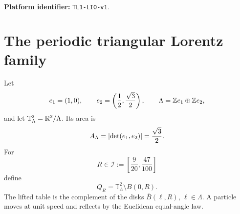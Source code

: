 
\begin{abstract}
We construct a deterministic path-ensemble theory on a compact periodic
finite-horizon Sinai billiard with a genuinely nonconjugate moving scatterer.
The configuration is the triangular lattice Lorentz gas with one circular
scatterer per cell and radius in a compact subinterval of
$(\sqrt3/4,1/2)$.  The quotient table is compact, the horizon is uniformly
finite, and the collision map preserves the natural Liouville cosine measure.
In fixed angular boundary coordinates this measure is independent of the
radius.

The mechanical observable is the first lattice coordinate of the actual cell
displacement between successive collisions.  Its twisted Lorentz transfer
operator has a simple leading eigenvalue near the origin.  We derive a local
large-deviation principle, prove strict convexity from the nondegenerate Lorentz displacement
local-limit packet, and define the endogenous conjugate field by
$\theta_R(j)=(\Lambda_R')^{-1}(j)=I_R'(j)$.  A new two-sided central-window
Gibbs-conditioning theorem identifies current-conditioned Liouville paths with
the canonical driven equilibrium, with the endpoint eigenfunction bias
removed.  The driven kernel is only a conditional representation: every full
trajectory remains a deterministic orbit of the same specular billiard.

The radius family is not a similarity family.  Two normal period-two orbits
have incommensurate radius responses, and the mean free-flight time has an
explicit strictly negative Santal\'o derivative.  These results provide the
single physical platform imported by the remaining four papers.
\end{abstract}
\maketitle
\noindent\textbf{Platform identifier:} \texttt{TL1-LIO-v1}.

\tableofcontents

\section{The periodic triangular Lorentz family}\label{sec:geometry}
Let
\[
 e_1=(1,0),\qquad e_2=\left(\frac12,\frac{\sqrt3}{2}\right),
 \qquad \Lambda=\mathbb Z e_1\oplus\mathbb Z e_2,
\]
and let $\mathbb T_\Lambda^2=\mathbb R^2/\Lambda$.  Its area is
\[
 A_\Lambda=\left\lvert \det(e_1,e_2)\right\rvert=\frac{\sqrt3}{2}.
\]
For
\[
 R\in\mathcal I:=\left[\frac9{20},\frac{47}{100}\right]
\]
define
\[
 Q_R=\mathbb T_\Lambda^2\setminus \overline B(0,R).
\]
The lifted table is the complement of the disks
$\overline B(\ell,R)$, $\ell\in\Lambda$.  A particle moves at unit speed and
reflects by the Euclidean equal-angle law.

